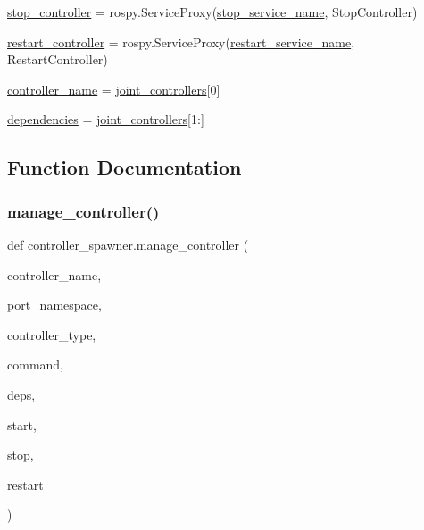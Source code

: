 \begin{DoxyCompactItemize}
\item 
\hyperlink{namespacecontroller__spawner_abb7c023c547b422e17287d367fe0de8e}{stop\+\_\+controller} = rospy.\+Service\+Proxy(\hyperlink{namespacecontroller__spawner_addbe1e6c1654b63878f7d1d23d201d25}{stop\+\_\+service\+\_\+name}, Stop\+Controller)
\item 
\hyperlink{namespacecontroller__spawner_ad1bd5e722a8cd83baf3a907520853c2d}{restart\+\_\+controller} = rospy.\+Service\+Proxy(\hyperlink{namespacecontroller__spawner_ae74db8f9d8ea66394dacfe6b0838e0b9}{restart\+\_\+service\+\_\+name}, Restart\+Controller)
\item 
\hyperlink{namespacecontroller__spawner_a1250390c451d11dbad2361ac6a4d201a}{controller\+\_\+name} = \hyperlink{namespacecontroller__spawner_a4e454e12ceb216c43975a5ad8abee590}{joint\+\_\+controllers}\mbox{[}0\mbox{]}
\item 
\hyperlink{namespacecontroller__spawner_a87f13bb4c1231b1185b29976f98aa894}{dependencies} = \hyperlink{namespacecontroller__spawner_a4e454e12ceb216c43975a5ad8abee590}{joint\+\_\+controllers}\mbox{[}1\+:\mbox{]}
\end{DoxyCompactItemize}


\subsection{Function Documentation}
\mbox{\label{namespacecontroller__spawner_a35e2c94db3e9253a989ac159ad9077c3}} 
\subsubsection{\texorpdfstring{manage\+\_\+controller()}{manage\_controller()}}
{\footnotesize\ttfamily def controller\+\_\+spawner.\+manage\+\_\+controller (\begin{DoxyParamCaption}\item[{}]{controller\+\_\+name,  }\item[{}]{port\+\_\+namespace,  }\item[{}]{controller\+\_\+type,  }\item[{}]{command,  }\item[{}]{deps,  }\item[{}]{start,  }\item[{}]{stop,  }\item[{}]{restart }\end{DoxyParamCaption})}



